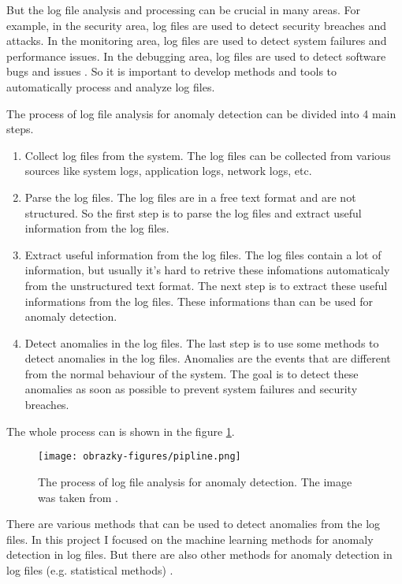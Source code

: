 But the log file analysis and processing can be crucial in many areas. For example, in the security area, log files are used to detect security breaches and attacks. 
In the monitoring area, log files are used to detect system failures and performance issues. In the debugging area, log files are used to detect software bugs and issues \cite{inbook}. %
So it is important to develop methods and tools to automatically process and analyze log files. 

The process of log file analysis for anomaly detection can be divided into 4 main steps.
\begin{enumerate}
    \item Collect log files from the system. The log files can be collected from various sources like system logs, application logs, network logs, etc. 
    \item Parse the log files. The log files are in a free text format and are not structured. So the first step is to parse the log files and extract useful information from the log files.
    \item Extract useful information from the log files. The log files contain a lot of information, but usually it's hard to retrive these infomations automaticaly from the unstructured text format. The next step is to extract these useful informations from the log files. These informations than can be used for anomaly detection.
    \item Detect anomalies in the log files. The last step is to use some methods to detect anomalies in the log files. Anomalies are the events that are different from the normal behaviour of the system. The goal is to detect these anomalies as soon as possible to prevent system failures and security breaches.
\end{enumerate}

The whole process can is shown in the figure \ref{fig:log_process}.

\begin{figure}
    \centering
    \texttt{[image: obrazky-figures/pipline.png]}
    \caption{The process of log file analysis for anomaly detection. The image was taken from \cite{goat}.}
    \label{fig:log_process}
\end{figure}

There are various methods that can be used to detect anomalies from the log files. In this project I focused on the machine learning methods for anomaly detection in log files.
But there are also other methods for anomaly detection in log files (e.g. statistical methods) \cite{article}. %

